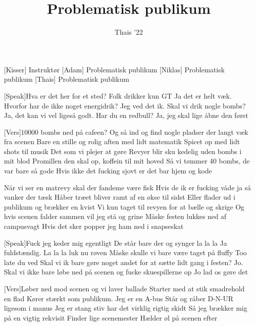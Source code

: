 \documentclass[a4paper,11pt]{article}
\title{Problematisk publikum}
\author{Thais '22}
\begin{document}
\maketitle

\begin{roles}
[Kisser] Instruktør
[Adam] Problematisk publikum
[Niklas] Problematisk publikum
[Thais] Problematisk publikum
\end{roles}

\begin{song}
[Speak]Hva er det her for et sted? Folk drikker kun GT
Ja det er helt væk. Hvorfor har de ikke noget energidrik?
Jeg ved det ik. Skal vi drik nogle bombs?
Ja, det kan vi vel ligeså godt. Har du en redbull?
Ja, jeg skal lige åbne den først

[Vers]$10000$ bombs ned på cafeen? 
Og så ind og find nogle pladser der langt væk fra scenen 
Bare en stille og rolig aften med lidt matematik
Spicet op med lidt shots til musik
Det som vi plejer at gøre
Revyer blir sku kedelig uden bombs i mit blod
Promillen den skal op, koffein til mit hoved
Så vi tømmer 40 bombs, de var bare så gode
Hvis ikke det fucking sjovt er det bar hjem og kode

Når vi ser en matrevy skal der fandeme være fisk
Hvis de ik er fucking våde ja så vanker der tæsk 
Håber træet bliver ramt af en økse til sidst
Eller flader ud i publikum og brækker en kvist
Vi kun taget til revyen for at bælle og skrige
Og hvis scenen falder sammen vil jeg stå og grine
Måske festen lukkes ned af campusvagt
Hvis det sker popper jeg ham ned i snapseskat

[Speak]Fuck jeg keder mig egentligt
De står bare der og synger la la la
Ja fuldstændig. La la la luk nu røven
Måske skulle vi bare være taget på fluffy 
Too late du ved
Skal vi ik bare gøre noget andet for at sætte lidt gang i festen?
Jo. 
Skal vi ikke bare løbe ned på scenen og fucke skuespillerne op
Jo lad os gøre det

[Vers]Løber ned mod scenen og vi laver ballade
Starter med at stik smadrehold en flad 
Kører stærkt som publikum. Jeg er en A-bus 
Står og råber D-N-UR ligesom i manus 
Jeg er stang stiv har det virklig rigtig skidt
Så jeg brækker mig på en vigtig rekvisit
Finder lige scenemester 
Hælder øl på scenen efter 


\end{song}
\end{document}

